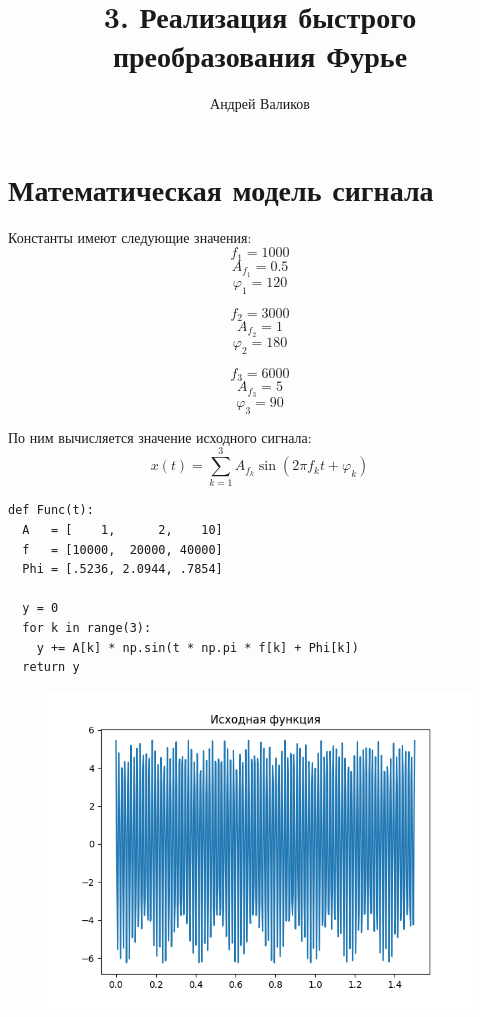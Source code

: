 \documentclass[12pt]{article}
\begin{document}
\title{3. Реализация быстрого преобразования Фурье}
\author{Андрей Валиков}
\date{}
\maketitle
																																																								\section{Математическая модель сигнала}

\noindent Константы имеют следующие значения:
\[f_1 = 1000\]
\[A_{f_1} = 0.5\]
\[\varphi_1 = 120\]

\[f_2 = 3000\]
\[A_{f_2} = 1\]
\[\varphi_2 = 180\]

\[f_3 = 6000\]
\[A_{f_3} = 5\]
\[\varphi_3 = 90\]

По ним вычисляется значение исходного сигнала:
\[x(t) = \sum_{k = 1}^{3} A_{f_k}\sin(2\pi f_k t + \varphi_k)\]

\begin{lstlisting}
def Func(t):
  A   = [    1,      2,    10]
  f   = [10000,  20000, 40000]
  Phi = [.5236, 2.0944, .7854]

  y = 0
  for k in range(3):
    y += A[k] * np.sin(t * np.pi * f[k] + Phi[k])
  return y
\end{lstlisting}

\begin{figure}[!htb]
\centering
\caption{}
\label{}
\end{figure}

\begin{figure}[htp]
\centering
\includegraphics[scale=1.00]{origin.png}
\caption{}
\label{}
\end{figure}
\end{document}
